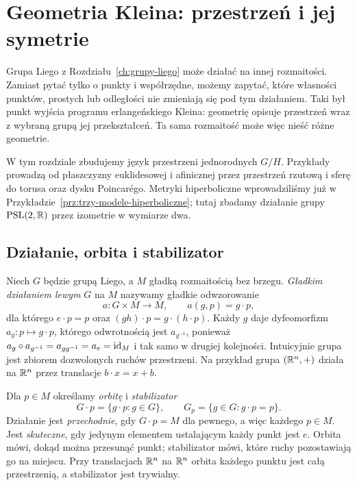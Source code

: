 \chapter{Geometria Kleina: przestrzeń i jej symetrie}
\label{ch:geometria-kleina}

Grupa Liego z Rozdziału~\ref{ch:grupy-liego} może działać na innej
rozmaitości. Zamiast pytać tylko o punkty i współrzędne, możemy
zapytać, które własności punktów, prostych lub odległości nie zmieniają
się pod tym działaniem. Taki był punkt wyjścia programu erlangeńskiego
Kleina: geometrię opisuje przestrzeń wraz z wybraną grupą jej
przekształceń. Ta sama rozmaitość może więc nieść różne geometrie.

W tym rozdziale zbudujemy język przestrzeni jednorodnych $G/H$.
Przykłady prowadzą od płaszczyzny euklidesowej i afinicznej przez
przestrzeń rzutową i sferę do torusa oraz dysku Poincarégo. Metryki
hiperboliczne wprowadziliśmy już w
Przykładzie~\ref{prz:trzy-modele-hiperboliczne}; tutaj zbadamy działanie
grupy $\mathrm{PSL}(2,\mathbb{R})$ przez izometrie w wymiarze dwa.

\section{Działanie, orbita i stabilizator}
\label{sec:klein-dzialanie}

\begin{definicja}
\label{def:klein-dzialanie}
Niech $G$ będzie grupą Liego, a $M$ gładką rozmaitością bez brzegu.
\emph{Gładkim działaniem lewym} $G$ na $M$ nazywamy gładkie
odwzorowanie
\[
 a:G\times M\longrightarrow M,\qquad a(g,p)=g\cdot p,
\]
dla którego $e\cdot p=p$ oraz $(gh)\cdot p=g\cdot(h\cdot p)$.
Każdy $g$ daje dyfeomorfizm $a_g:p\mapsto g\cdot p$, którego
odwrotnością jest $a_{g^{-1}}$, ponieważ
$a_g\circ a_{g^{-1}}=a_{gg^{-1}}=a_e=\mathrm{id}_M$
i tak samo w drugiej kolejności. Intuicyjnie grupa jest zbiorem
dozwolonych ruchów przestrzeni. Na przykład grupa $(\mathbb{R}^n,+)$ działa
na $\mathbb{R}^n$ przez translacje $b\cdot x=x+b$.
\end{definicja}

\begin{definicja}
\label{def:klein-orbita}
Dla $p\in M$ określamy \emph{orbitę} i \emph{stabilizator}
\[
 G\cdot p=\{g\cdot p:g\in G\},\qquad
 G_p=\{g\in G:g\cdot p=p\}.
\]
Działanie jest \emph{przechodnie}, gdy $G\cdot p=M$ dla pewnego,
a więc każdego $p\in M$. Jest \emph{skuteczne}, gdy jedynym elementem
ustalającym każdy punkt jest $e$. Orbita mówi, dokąd można przesunąć
punkt; stabilizator mówi, które ruchy pozostawiają go na miejscu.
Przy translacjach $\mathbb{R}^n$ na $\mathbb{R}^n$ orbita każdego punktu jest całą
przestrzenią, a stabilizator jest trywialny.
\end{definicja}

